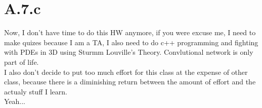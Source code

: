 \documentclass[]{article}
\begin{document}
    \section*{A.7.c}
        Now, I don't have time to do this HW anymore, if you were excuse me, I need to make quizes because I am a TA, I also need to do c++ programming and fighting with PDEs in 3D using Sturmm Louville's Theory. Convlutional network is only part of life. 
        \\
        I also don't decide to put too much effort for this class at the expense of other class, because there is a diminishing return between the amount of effort and the actualy stuff I learn. 
        \\
        Yeah...
        
\end{document}

